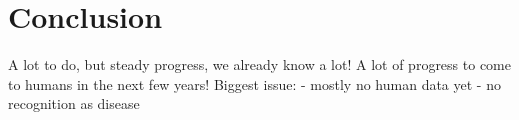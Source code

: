 \section{Conclusion}


\begin{frame}[c]
    A lot to do, but steady progress, we already know a lot!
    A lot of progress to come to humans in the next few years!
    Biggest issue: 
    - mostly no human data yet
    - no recognition as disease
\end{frame}
